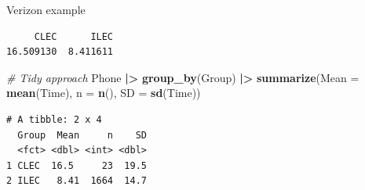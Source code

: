 \documentclass[
  ignorenonframetext,
]{beamer}
\newenvironment{Shaded}{\begin{snugshade}}{\end{snugshade}}
\newcommand{\AttributeTok}[1]{\textcolor[rgb]{0.13,0.29,0.53}{#1}}
\newcommand{\CommentTok}[1]{\textcolor[rgb]{0.56,0.35,0.01}{\textit{#1}}}
\newcommand{\FunctionTok}[1]{\textcolor[rgb]{0.13,0.29,0.53}{\textbf{#1}}}
\newcommand{\NormalTok}[1]{#1}
\newcommand{\OtherTok}[1]{\textcolor[rgb]{0.56,0.35,0.01}{#1}}
\newcommand{\SpecialCharTok}[1]{\textcolor[rgb]{0.81,0.36,0.00}{\textbf{#1}}}
\begin{document}
\begin{frame}[fragile]{Verizon example}
\label{verizon-example-1}
\normalsize

\begin{Shaded}
\end{Shaded}

\begin{verbatim}
     CLEC      ILEC 
16.509130  8.411611 
\end{verbatim}

\begin{Shaded}
\begin{Highlighting}[]
\CommentTok{\# Tidy approach}
\NormalTok{Phone }\SpecialCharTok{|\textgreater{}} 
  \FunctionTok{group\_by}\NormalTok{(Group) }\SpecialCharTok{|\textgreater{}} 
  \FunctionTok{summarize}\NormalTok{(}\AttributeTok{Mean =} \FunctionTok{mean}\NormalTok{(Time), }\AttributeTok{n =} \FunctionTok{n}\NormalTok{(), }\AttributeTok{SD =} \FunctionTok{sd}\NormalTok{(Time))}
\end{Highlighting}
\end{Shaded}

\begin{verbatim}
# A tibble: 2 x 4
  Group  Mean     n    SD
  <fct> <dbl> <int> <dbl>
1 CLEC  16.5     23  19.5
2 ILEC   8.41  1664  14.7
\end{verbatim}

\normalsize
\end{frame}
\end{document}

